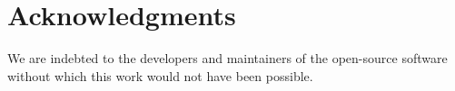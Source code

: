 \documentclass[twocolumn]{article}
\begin{document}
\section{Acknowledgments}

We are indebted to the developers and maintainers of the open-source
software without which this work would not have been possible.




\end{document}
